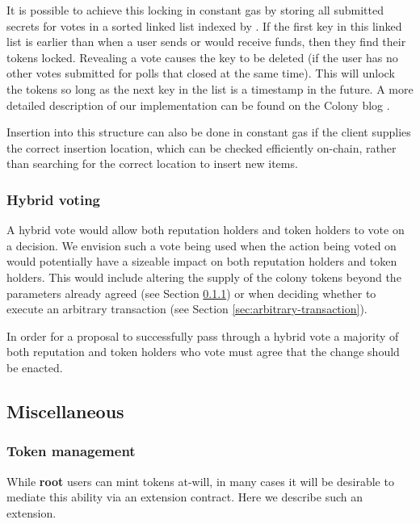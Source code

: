 It is possible to achieve this locking in constant gas by storing all submitted secrets for votes in a sorted linked list indexed by . If the first key in this linked list is earlier than  when a user sends or would receive funds, then they find their tokens locked. Revealing a vote causes the key to be deleted (if the user has no other votes submitted for polls that closed at the same time). This will unlock the tokens so long as the next key in the list is a timestamp in the future. A more detailed description of our implementation can be found on the Colony blog \cite{ColonyVoting}.

Insertion into this structure can also be done in constant gas if the client supplies the correct insertion location, which can be checked efficiently on-chain, rather than searching for the correct location to insert new items.

\subsubsection*{Hybrid voting}

A hybrid vote would allow both reputation holders and token holders to vote on a decision. We envision such a vote being used when the action being voted on would potentially have a sizeable impact on both reputation holders and token holders. This would include altering the supply of the colony tokens beyond the parameters already agreed (see Section \ref{sec:colony-token-management}) or when deciding whether to execute an arbitrary transaction (see Section \ref{sec:arbitrary-transaction}).

In order for a proposal to successfully pass through a hybrid vote a majority of both reputation and token holders who vote must agree that the change should be enacted.

\subsection{Miscellaneous}\label{sec:extensions-misc}

\subsubsection{Token management}\label{sec:colony-token-management}

While \textbf{root} users can mint tokens at-will, in many cases it will be desirable to mediate this ability via an extension contract. Here we describe such an extension.

